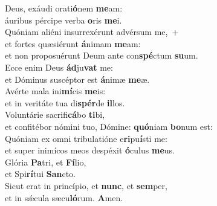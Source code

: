 \evenverse Deus, exáudi orati\textbf{ó}nem \textbf{me}am:~\*\\
\evenverse áuribus pércipe verba \textbf{o}ris \textbf{me}i.\\
\oddverse Quóniam aliéni insurrexérunt advérsum me,~+\\
\oddverse  et fortes quæsiérunt \textbf{á}nimam \textbf{me}am:~\*\\
\oddverse et non proposuérunt Deum ante con\textbf{spé}ctum \textbf{su}um.\\
\evenverse Ecce enim Deus \textbf{ád}ju\textbf{vat} me:~\*\\
\evenverse et Dóminus suscéptor est \textbf{á}nimæ \textbf{me}æ.\\
\oddverse Avérte mala ini\textbf{mí}cis \textbf{me}is:~\*\\
\oddverse et in veritáte tua di\textbf{spér}de \textbf{il}los.\\
\evenverse Voluntárie sacrifi\textbf{cá}bo \textbf{ti}bi,~\*\\
\evenverse et confitébor nómini tuo, Dómine: \textbf{quó}niam \textbf{bo}num est:\\
\oddverse Quóniam ex omni tribulatióne e\textbf{ri}pu\textbf{í}sti me:~\*\\
\oddverse et super inimícos meos despéxit \textbf{ó}culus \textbf{me}us.\\
\evenverse Glória \textbf{Pa}tri, et \textbf{Fí}lio,~\*\\
\evenverse et Spi\textbf{rí}tui \textbf{San}cto.\\
\oddverse Sicut erat in princípio, et \textbf{nunc}, et \textbf{sem}per,~\*\\
\oddverse et in sǽcula sæcu\textbf{ló}rum. \textbf{A}men.\\
